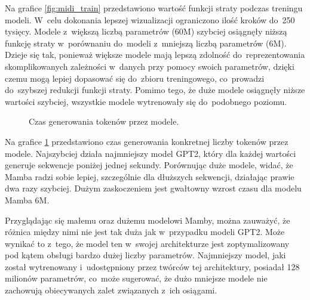 \documentclass[data-science]{agh-wi} %
\begin{document}
Na grafice \ref*{fig:midi_train} przedstawiono wartość funkcji straty podczas treningu modeli. W~celu dokonania lepszej wizualizacji ograniczono ilość kroków do~250 tysięcy. Modele z~większą liczbą parametrów (60M) szybciej osiągnęły niższą funkcję straty w~porównaniu do~modeli z~mniejszą liczbą parametrów (6M). Dzieje się tak, ponieważ większe modele mają lepszą zdolność do~reprezentowania skomplikowanych zależności w~danych przy pomocy swoich parametrów, dzięki czemu mogą lepiej dopasować się do~zbioru treningowego, co~prowadzi do~szybszej redukcji funkcji straty. Pomimo tego, że duże modele osiągnęły niższe wartości szybciej, wszystkie modele wytrenowały się do~podobnego poziomu.

\begin{figure}
    \centering
    \caption{Czas generowania tokenów przez modele.}\label{fig:time_generate}
\end{figure}

Na grafice \ref*{fig:time_generate} przedstawiono czas generowania konkretnej liczby tokenów przez modele. Najszybciej działa najmniejszy model GPT2, który dla każdej wartości generuje sekwencje poniżej jednej sekundy. Porównując duże modele, widać, że Mamba radzi sobie lepiej, szczególnie dla dłuższych sekwencji, działając prawie dwa razy szybciej. Dużym zaskoczeniem jest gwałtowny wzrost czasu dla modelu Mamba 6M.

Przyglądając się małemu oraz dużemu modelowi Mamby, można zauważyć, że różnica między nimi nie jest tak duża jak w~przypadku modeli GPT2. Może wynikać to z~tego, że model ten w~swojej architekturze jest zoptymalizowany pod kątem obsługi bardzo dużej liczby parametrów. Najmniejszy model, jaki został wytrenowany i~udostępniony przez twórców tej architektury, posiadał 128 milionów parametrów, co~może sugerować, że dużo mniejsze modele nie zachowują obiecywanych zalet związanych z~ich osiągami.
\end{document}
